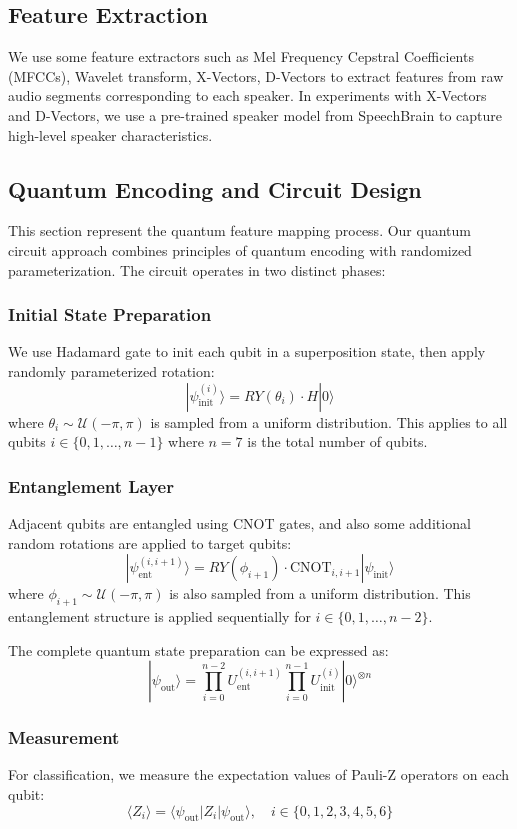\documentclass[conference]{IEEEtran}
\begin{document}
\subsection{Feature Extraction}

We use some feature extractors such as Mel Frequency Cepstral Coefficients (MFCCs), Wavelet transform, X-Vectors, D-Vectors to extract features from raw audio segments corresponding to each speaker. In experiments with X-Vectors and D-Vectors, we use a pre-trained speaker model from SpeechBrain to capture high-level speaker characteristics.

\subsection{Quantum Encoding and Circuit Design}
This section represent the quantum feature mapping process. Our quantum circuit approach combines principles of quantum encoding with randomized parameterization. The circuit operates in two distinct phases:

\subsubsection{Initial State Preparation}
We use Hadamard gate to init each qubit in a superposition state, then apply randomly parameterized rotation:
\[
    |\psi_{\text{init}}^{(i)}\rangle = RY(\theta_i) \cdot H |0\rangle
\]
where $\theta_i \sim \mathcal{U}(-\pi, \pi)$ is sampled from a uniform distribution. This applies to all qubits $i \in \{0, 1, \ldots, n-1\}$ where $n=7$ is the total number of qubits.

\subsubsection{Entanglement Layer}
Adjacent qubits are entangled using CNOT gates, and also some additional random rotations are applied to target qubits:
\[
    |\psi_{\text{ent}}^{(i,i+1)}\rangle = RY(\phi_{i+1}) \cdot \text{CNOT}_{i,i+1} |\psi_{\text{init}}\rangle
\]
where $\phi_{i+1} \sim \mathcal{U}(-\pi, \pi)$ is also sampled from a uniform distribution. This entanglement structure is applied sequentially for $i \in \{0, 1, \ldots, n-2\}$.

The complete quantum state preparation can be expressed as:
\[
    |\psi_{\text{out}}\rangle = \prod_{i=0}^{n-2} U_{\text{ent}}^{(i,i+1)} \prod_{i=0}^{n-1} U_{\text{init}}^{(i)} |0\rangle^{\otimes n}
\]

\subsubsection{Measurement}
For classification, we measure the expectation values of Pauli-Z operators on each qubit:
\[
    \langle Z_i \rangle = \langle\psi_{\text{out}}|Z_i|\psi_{\text{out}}\rangle, \quad i \in \{0,1,2,3,4,5,6\}
\]
\end{document}
